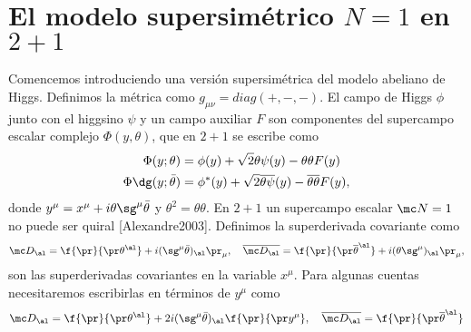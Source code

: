 \section{El modelo supersimétrico $N=1$ en $2+1$}

Comencemos introduciendo una versión supersimétrica del modelo abeliano de Higgs. Definimos la métrica como $g_{\mu\nu}=diag(+,-,-)$. El campo de Higgs $\phi$ junto con el higgsino $\psi$ y un campo auxiliar $F$ son componentes del supercampo escalar complejo $\Phi(y,\theta)$, que en $2+1$ se escribe como
\begin{align}
	\Phi(y;\theta) &= \phi(y)+\sqrt 2\theta\psi(y)-\theta\theta F(y) \label{eq:5.2.0.1} \\
	\Phi\dg(y;\bar\theta) &= \phi^*(y)+\sqrt 2\overline{\theta\psi}(y)-\overline{\theta\theta} F(y),
\end{align}
donde $y^\mu=x^\mu+i\theta\sg^\mu\bar\theta$ y $\theta^2 = \theta\theta$. En $2+1$ un supercampo escalar $\mc N=1$ no puede ser quiral [Alexandre2003]. Definimos la superderivada covariante como
\begin{align}
	\mc D_\al = \f{\pr}{\pr\theta^\al}+i(\sg^\mu\bar\theta)_\al\pr_\mu, \ \ \ \overline{\mc D_\al} = \f{\pr}{\pr\overline\theta^\al}+i(\theta\sg^\mu)_\al\pr_\mu,
\end{align}
son las superderivadas covariantes en la variable $x^\mu$. Para algunas cuentas necesitaremos escribirlas en términos de $y^\mu$ como
\begin{align}
	\mc D_\al = \f{\pr}{\pr\theta^\al}+2i(\sg^\mu\bar\theta)_\al\f{\pr}{\pr y^\mu}, \ \ \ \overline{\mc D_\al} = \f{\pr}{\pr\overline\theta^\al}
\end{align}

